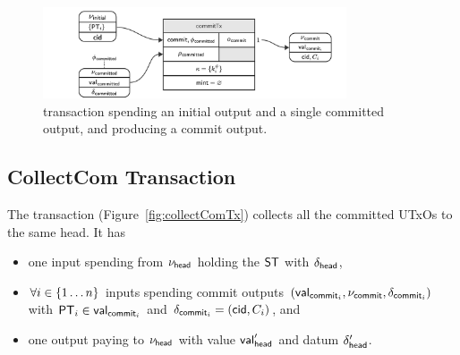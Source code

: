\begin{figure}[h] \centering
	\includegraphics[width=0.8\textwidth]{figures/commitTx.pdf}
	\caption{\mtxCom{} transaction spending an initial output and a single
		committed output, and producing a commit output.}\label{fig:commitTx}
\end{figure}

\subsection{CollectCom Transaction}\label{sec:collect-tx}

\noindent The \mtxCCom{} transaction (Figure~\ref{fig:collectComTx}) collects
all the committed UTxOs to the same head. It has
\begin{itemize}
	\item one input spending from $\nu_\mathsf{head}$ holding the $\mathsf{ST}$ with $\delta_{\mathsf{head}}$,
	\item $\forall i \in \{1 \dots n\}$ inputs spending commit outputs
	      $(\mathsf{val}_{\mathsf{commit}_{i}}, \nu_{\mathsf{commit}}, \delta_{\mathsf{commit}_{i}})$ with $\mathsf{PT}_{i} \in \mathsf{val}_{\mathsf{commit}_{i}}$
	      and $\delta_{\mathsf{commit}_{i}} = (\mathsf{cid}, C_{i})$, and
	\item one output paying to $\nu_\mathsf{head}$ with value $\mathsf{val}_{\mathsf{head}}'$ and
	      datum $\delta_{\mathsf{head}}'$.
\end{itemize}


